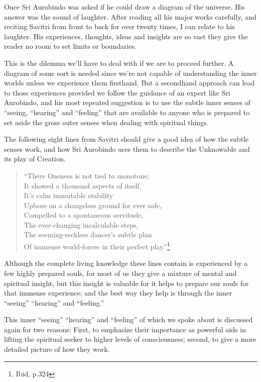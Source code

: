 \documentclass[12pt,a4paper]{book}
\begin{document}
Once Sri Aurobindo was asked if he could draw a diagram of the
universe. His answer was the sound of laughter. After reading all his
major works carefully, and reciting Savitri from front to back for
over twenty times, I can relate to his laughter. His experiences,
thoughts, ideas and insights are so vast they give the reader no room
to set limits or boundaries.

This is the dilemma we'll have to deal with if we are to proceed
further. A diagram of some sort is needed since we're not capable of
understanding the inner worlds unless we experience them
firsthand. But a secondhand approach can lead to those experiences
provided we follow the guidance of an expert like Sri Aurobindo, and
his most repeated suggestion is to use the subtle inner senses of
``seeing, ``hearing'' and ``feeling'' that are available to anyone who
is prepared to set aside the gross outer senses when dealing with
spiritual things.

The following eight lines from Savitri should give a good idea of how
the subtle senses work, and how Sri Aurobindo uses them to describe
the Unknowable and its play of Creation.

\begin{verse}
``There Oneness is not tied to monotone;\\
It showed a thousand aspects of itself,\\
It's calm immutable stability\\
Upbore on a changeless ground for ever safe,\\
Compelled to a spontaneous servitude,\\
The ever-changing incalculable steps,\\
The seeming-reckless dancer's subtle plan\\
Of immense world-forces in their perfect play.''\footnote{Ibid, p.324}
\end{verse}

Although the complete living knowledge these lines contain is
experienced by a few highly prepared souls, for most of us they give a
mixture of mental and spiritual insight, but this insight is valuable
for it helps to prepare our souls for that immense experience; and the
best way they help is through the inner ``seeing'' ``hearing'' and
``feeling.''


\label{label2}
This inner ``seeing'' ``hearing'' and ``feeling'' of which we spoke
about is discussed again for two reasons: First, to emphasize their
importance as powerful aids in lifting the spiritual seeker to higher
levels of consciousness; second, to give a more detailed picture of
how they work.
\end{document}
